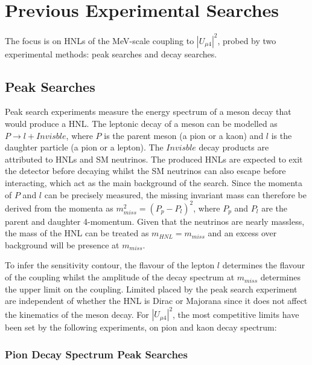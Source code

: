 \section{Previous Experimental Searches}



The focus is on HNLs of the MeV-scale coupling to $|U_{\mu4}|^{2}$, probed by two experimental methods: peak searches and decay searches.

\subsection{Peak Searches}

Peak search experiments measure the energy spectrum of a meson decay that would produce a HNL. 
The leptonic decay of a meson can be modelled as $P\rightarrow l + Invisble$, where $P$ is the parent meson (a pion or a kaon) and $l$ is the daughter particle (a pion or a lepton).
The $Invisble$ decay products are attributed to HNLs and SM neutrinos.
The produced HNLs are expected to exit the detector before decaying whilst the SM neutrinos can also escape before interacting, which act as the main background of the search.
Since the momenta of $P$ and $l$ can be precisely measured, the missing invariant mass can therefore be derived from the momenta as $m^{2}_{miss} = (P_{p} - P_{l})^{2}$, where $P_{p}$ and $P_{l}$ are the parent and daughter 4-momentum.
Given that the neutrinos are nearly massless, the mass of the HNL can be treated as $m_{HNL} = m_{miss}$ and an excess over background will be presence at $m_{miss}$.

To infer the sensitivity contour, the flavour of the lepton $l$ determines the flavour of the coupling whilst the amplitude of the decay spectrum at $m_{miss}$ determines the upper limit on the coupling.
Limited placed by the peak search experiment are independent of whether the HNL is Dirac or Majorana since it does not affect the kinematics of the meson decay.
For $|U_{\mu4}|^{2}$, the most competitive limits have been set by the following experiments, on pion and kaon decay spectrum:


\subsubsection{Pion Decay Spectrum Peak Searches}

